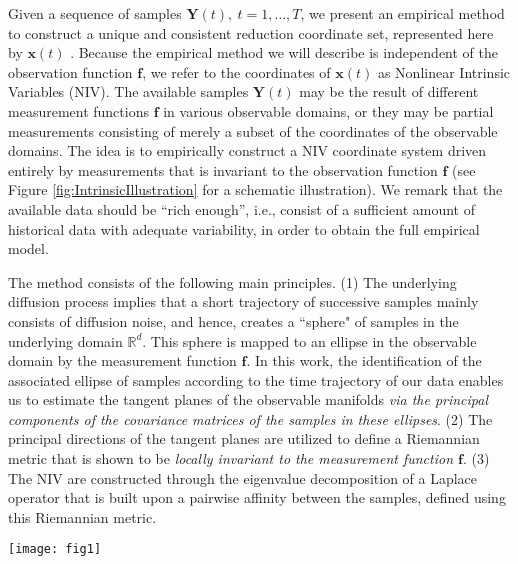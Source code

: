 \documentclass[aip,jcp,preprint]{revtex4-1}
\begin{document}
Given a sequence of samples $\mathbf{Y}(t), \ t=1,\ldots,T$, we present an empirical method to construct a unique and consistent reduction coordinate set, represented here by $\mathbf{x}(t)$ \cite{singer2008non}.
%
Because the empirical method we will describe is independent of the observation function $\mathbf{f}$,
we refer to the coordinates of $\mathbf{x}(t)$ as Nonlinear Intrinsic Variables (NIV).
%
The available samples $\mathbf{Y}(t)$ may be the result of different measurement functions $\mathbf{f}$ in various observable domains,
or they may be partial measurements consisting of merely a subset of the coordinates of the observable domains.
%
The idea is to empirically construct a NIV coordinate system driven entirely by measurements that is invariant to the observation function $\mathbf{f}$
(see Figure \ref{fig:IntrinsicIllustration} for a schematic illustration).
%
We remark that the available data should be ``rich enough'', i.e., consist of a sufficient amount of historical data with adequate variability, in order to obtain the full empirical model.

The method consists of the following main principles.
%
(1) The underlying diffusion process implies that a short trajectory of successive samples mainly consists of diffusion noise,
and hence, creates a ``sphere" of samples in the underlying domain $\mathbb{R}^d$.
%
This sphere is mapped to an ellipse in the observable domain by the measurement function $\mathbf{f}$.
%
In this work, the identification of the associated ellipse of samples according to the time trajectory of our data enables us
to estimate the tangent planes of the observable manifolds {\em via the principal components of the covariance matrices of the samples in these ellipses}.
%
(2) The principal directions of the tangent planes are utilized to define a Riemannian metric that is shown to be {\em locally invariant to the measurement function $\mathbf{f}$}.
%
(3) The NIV are constructed through the eigenvalue decomposition of a Laplace operator that is built upon a pairwise affinity between the samples, defined using this Riemannian metric.

\begin{figure*}[ht]
\texttt{[image: fig1]}
\caption{Illustration of the nonlinear embedding that yields an intrinsic representation independent of the measurement function $\mathbf{f}$. (Bottom) The underlying variables in which the noises are independent with unit variance. The circle illustrates samples from, say, a short trajectory in time that sample a disc on the manifold. (Top Left) The first set of observed variables. The ellipse illustrates the mapping of the sphere of the underlying samples into the observable domain via the first observation function. In this sketch, we illustrate that the observations might be {\em partial}, i.e., might consist of merely a subset of the observed domain variables. (Top Right) Second set of observable variables. The ellipse illustrates the mapping of the sphere of the underlying samples into this (different) observable domain via a second observation function.
\label{fig:IntrinsicIllustration}}
\end{figure*}
\end{document}
